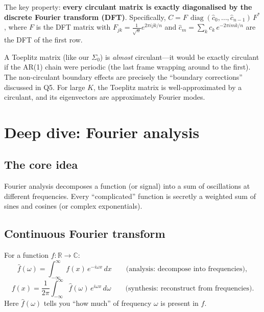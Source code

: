 \documentclass[11pt,a4paper]{article}
\newcommand{\R}{\mathbb{R}}
\newcommand{\C}{\mathbb{C}}
\newcommand{\diag}{\operatorname{diag}}
\begin{document}
The key property: \textbf{every circulant matrix is exactly diagonalised by the discrete Fourier transform (DFT)}.  Specifically, $C = F\,\diag(\hat{c}_0, \dots, \hat{c}_{n-1})\,F^*$, where $F$ is the DFT matrix with $F_{jk} = \frac{1}{\sqrt{n}}e^{2\pi i jk/n}$ and $\hat{c}_m = \sum_k c_k\,e^{-2\pi i mk/n}$ are the DFT of the first row.

A Toeplitz matrix (like our $\Sigma_0$) is \emph{almost} circulant---it would be exactly circulant if the AR(1) chain were periodic (the last frame wrapping around to the first).  The non-circulant boundary effects are precisely the ``boundary corrections'' discussed in Q5.  For large $K$, the Toeplitz matrix is well-approximated by a circulant, and its eigenvectors are approximately Fourier modes.


\section{Deep dive: Fourier analysis}
\label{sec:q17}

\subsection{The core idea}

Fourier analysis decomposes a function (or signal) into a sum of oscillations at different frequencies.  Every ``complicated'' function is secretly a weighted sum of sines and cosines (or complex exponentials).

\subsection{Continuous Fourier transform}

For a function $f : \R \to \C$:
\begin{equation}
  \hat{f}(\omega) = \int_{-\infty}^{\infty} f(x)\,e^{-i\omega x}\,dx \qquad \text{(analysis: decompose into frequencies)},
\end{equation}
\begin{equation}
  f(x) = \frac{1}{2\pi}\int_{-\infty}^{\infty} \hat{f}(\omega)\,e^{i\omega x}\,d\omega \qquad \text{(synthesis: reconstruct from frequencies)}.
\end{equation}
Here $\hat{f}(\omega)$ tells you ``how much'' of frequency $\omega$ is present in $f$.
\end{document}
